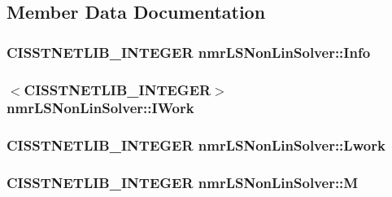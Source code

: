 \subsection{Member Data Documentation}
\hypertarget{classnmr_l_s_non_lin_solver_a592efff84d1cb170d3669b9f968db99b}{
\subsubsection[{Info}]{\setlength{\rightskip}{0pt plus 5cm}C\-I\-S\-S\-T\-N\-E\-T\-L\-I\-B\-\_\-\-I\-N\-T\-E\-G\-E\-R nmr\-L\-S\-Non\-Lin\-Solver\-::\-Info\hspace{0.3cm}{\ttfamily [protected]}}}\label{classnmr_l_s_non_lin_solver_a592efff84d1cb170d3669b9f968db99b}
\hypertarget{classnmr_l_s_non_lin_solver_a0c563e7168d837d88c9ecfe256bd4c16}{
\subsubsection[{I\-Work}]{$<$C\-I\-S\-S\-T\-N\-E\-T\-L\-I\-B\-\_\-\-I\-N\-T\-E\-G\-E\-R$>$ nmr\-L\-S\-Non\-Lin\-Solver\-::\-I\-Work\hspace{0.3cm}{\ttfamily [protected]}}}\label{classnmr_l_s_non_lin_solver_a0c563e7168d837d88c9ecfe256bd4c16}
\hypertarget{classnmr_l_s_non_lin_solver_a987d725eb629e7f092797e58caac9b73}{
\subsubsection[{Lwork}]{\setlength{\rightskip}{0pt plus 5cm}C\-I\-S\-S\-T\-N\-E\-T\-L\-I\-B\-\_\-\-I\-N\-T\-E\-G\-E\-R nmr\-L\-S\-Non\-Lin\-Solver\-::\-Lwork\hspace{0.3cm}{\ttfamily [protected]}}}\label{classnmr_l_s_non_lin_solver_a987d725eb629e7f092797e58caac9b73}
\hypertarget{classnmr_l_s_non_lin_solver_ae149f93166d678e971025b9c515426a5}{
\subsubsection[{M}]{\setlength{\rightskip}{0pt plus 5cm}C\-I\-S\-S\-T\-N\-E\-T\-L\-I\-B\-\_\-\-I\-N\-T\-E\-G\-E\-R nmr\-L\-S\-Non\-Lin\-Solver\-::\-M\hspace{0.3cm}{\ttfamily [protected]}}}\label{classnmr_l_s_non_lin_solver_ae149f93166d678e971025b9c515426a5}
